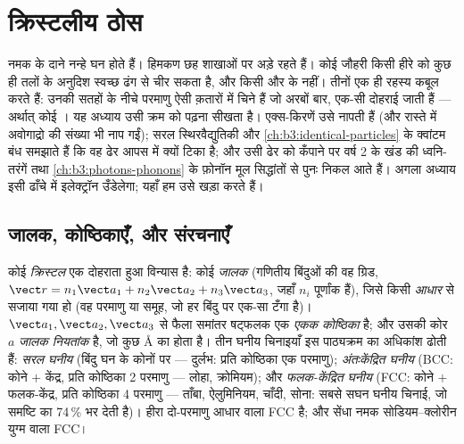 \chapter{क्रिस्टलीय ठोस}\label{ch:b3:crystalline-solids}


नमक के दाने नन्हे घन होते हैं। हिमकण छह शाखाओं पर अड़े रहते हैं। कोई
जौहरी किसी हीरे को कुछ ही तलों के अनुदिश स्वच्छ ढंग से चीर सकता है,
और किसी और के नहीं। तीनों एक ही रहस्य कबूल करते हैं: उनकी सतहों के
नीचे परमाणु ऐसी क़तारों में चिने हैं जो अरबों बार, एक-सी दोहराई जाती
हैं --- अर्थात् कोई \emph{}। यह अध्याय उसी क्रम को पढ़ना
सीखता है। एक्स-किरणें उसे नापती हैं (और रास्ते में अवोगाद्रो की संख्या
भी नाप गईं); सरल स्थिरवैद्युतिकी और
\cref{ch:b3:identical-particles} के क्वांटम बंध समझाते हैं कि वह ढेर
आपस में क्यों टिका है; और उसी ढेर को कँपाने पर वर्ष 2 के खंड की
ध्वनि-तरंगें तथा \cref{ch:b3:photons-phonons} के फ़ोनॉन मूल सिद्धांतों
से पुनः निकल आते हैं। अगला अध्याय इसी ढाँचे में इलेक्ट्रॉन उँडेलेगा;
यहाँ हम उसे खड़ा करते हैं।

\section{जालक, कोष्ठिकाएँ, और संरचनाएँ}

\begin{definition}[जालक और आधार]\label{def:b3:crystalline-solids:lattice}
कोई \emph{क्रिस्टल} एक दोहराता हुआ विन्यास है: कोई \emph{जालक}
(गणितीय बिंदुओं की वह ग्रिड, $\vect r = n_1\vect a_1 + n_2\vect a_2
+ n_3\vect a_3$, जहाँ $n_i$ पूर्णांक हैं), जिसे किसी \emph{आधार} से
सजाया गया हो (वह परमाणु या समूह, जो हर बिंदु पर एक-सा टँगा है)।
$\vect a_1, \vect a_2, \vect a_3$ से फैला समांतर षट्फलक एक
\emph{एकक कोष्ठिका} है; और उसकी कोर $a$ \emph{जालक नियतांक} है, जो
कुछ \unit{\angstrom} का होता है। तीन घनीय चिनाइयाँ इस पाठ्यक्रम का
अधिकांश ढोती हैं: \emph{सरल घनीय} (बिंदु घन के कोनों पर --- दुर्लभ:
प्रति कोष्ठिका एक परमाणु); \emph{अंतःकेंद्रित घनीय} (BCC: कोने $+$
केंद्र, प्रति कोष्ठिका 2 परमाणु --- लोहा, क्रोमियम); और
\emph{फलक-केंद्रित घनीय} (FCC: कोने $+$ फलक-केंद्र, प्रति कोष्ठिका 4
परमाणु --- ताँबा, ऐलुमिनियम, चाँदी, सोना: सबसे सघन घनीय चिनाई, जो
समष्टि का 74\,\% भर देती है)। हीरा दो-परमाणु आधार वाला FCC है; और
सेंधा नमक सोडियम--क्लोरीन युग्म वाला FCC।
\end{definition}


